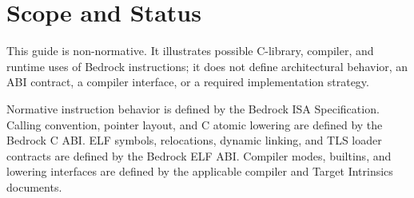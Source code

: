 \documentclass[10pt,twoside]{article}
\begin{document}
\BedrockFrontMatter

\clearpage
\section{Scope and Status}
This guide is non-normative. It illustrates possible C-library, compiler, and
runtime uses of Bedrock instructions; it does not define architectural
behavior, an ABI contract, a compiler interface, or a required implementation
strategy.

Normative instruction behavior is defined by the Bedrock ISA Specification.
Calling convention, pointer layout, and C atomic lowering are defined by the
Bedrock C ABI. ELF symbols, relocations, dynamic linking, and TLS loader
contracts are defined by the Bedrock ELF ABI. Compiler modes, builtins, and
lowering interfaces are defined by the applicable compiler and Target
Intrinsics documents.




\end{document}
